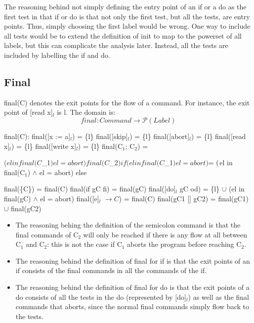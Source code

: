 The reasoning behind not simply defining the entry point of an if or a do as the first
test in that if or do is that not only the first test, but all the tests, are entry points.
Thus, simply choosing the first label would be wrong. One way to include all tests would
be to extend the definition of init to map to the powerset of all labels, but this
can complicate the analysis later. Instead, all the tests are included by labelling
the if and do.



\subsection{Final}

final(C) denotes the exit points for the flow of a command.
For instance, the exit point of [read x]$_l$ is l. The domain is:
\[final \colon Command \to \mathcal{P}(Label)\]

final(C):\newline
final([x := a]$_l$)      = \{l\}\newline
final([skip]$_l$)        = \{l\}\newline
final([abort]$_l$)       = \{l\}\newline
final([read x]$_l$)      = \{l\}\newline
final([write x]$_l$)   	 = \{l\}\newline
final(C$_1$; C$_2$)		 = \begin{cases}
($el in final(C$_1$) $\wedge$ el = abort) $\cup$ final(C$_2$) if (el in final(C$_1$) $\wedge$ el $\not$ = abort) $\not = \emptyset$ \\
($el in final(C$_1$) $\wedge$ el = abort) else
\end{cases}\newline
final(\{C\})             = final(C)\newline
final(if gC fi)        = final(gC)\newline
final([do]$_l$ gC od)        = \{l\} $\cup$ (el in final(gC) $\wedge$ el = abort)\newline
final([e]$_l$ $\to C$)      = final(C)\newline
final(gC1 [] gC2)      = final(gC1) $\cup$ final(gC2)\newline

\begin{itemize}
\item The reasoning behing the definition of the semicolon command is that the
final commands of C$_2$ will only be reached if there is any flow at all
between C$_1$ and C$_2$: this is not the case if C$_1$ aborts the program
before reaching C$_2$.
\item The reasoning behind the definition of final for if is that the exit points
of an if consists of the final commands in all the commands of the if.
\item The reasoning behind the definition of final for do is that the exit points
of a do consists of all the tests in the do (represented by [do]$_l$)
as well as the final commands that aborts, since the normal final commands
simply flow back to the tests.
\end{itemize}



